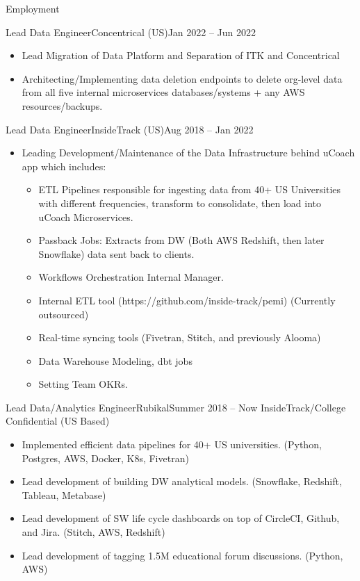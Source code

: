 \documentclass[]{ahmedamrcv_saudi}
\begin{document}
\begin{cvsection}{Employment}
		\begin{cvsubsection}{Lead Data Engineer}{Concentrical (US)}{Jan 2022 -- Jun 2022}
			\begin{itemize}
				\item Lead Migration of Data Platform and Separation of ITK and Concentrical
				\item Architecting/Implementing data deletion endpoints to delete org-level data from all five internal microservices databases/systems + any AWS resources/backups.
			\end{itemize}
		\end{cvsubsection}

		\begin{cvsubsection}{Lead Data Engineer}{InsideTrack (US)}{Aug 2018 -- Jan 2022}
			\begin{itemize}
				\item Leading Development/Maintenance of the Data Infrastructure behind uCoach app which includes:
				\begin{itemize}
					\item ETL Pipelines responsible for ingesting data from 40+ US Universities with different frequencies, transform to consolidate, then load into uCoach Microservices.
					\item Passback Jobs: Extracts from DW (Both AWS Redshift, then later Snowflake) data sent back to clients.
					\item Workflows Orchestration Internal Manager.
					\item Internal ETL tool (https://github.com/inside-track/pemi) (Currently outsourced)
					\item Real-time syncing tools (Fivetran, Stitch, and previously Alooma)
					\item Data Warehouse Modeling, dbt jobs
					\item Setting Team OKRs.
				\end{itemize}
			\end{itemize}
		\end{cvsubsection}

		\begin{cvsubsection}{Lead Data/Analytics Engineer}{Rubikal}{Summer 2018 -- Now}
			{InsideTrack/College Confidential} (US Based)			
			\begin{itemize}
				\item Implemented efficient data pipelines for 40+ US universities. (Python, Postgres, AWS, Docker, K8s, Fivetran)
				\item Lead development of building DW analytical models. (Snowflake, Redshift, Tableau, Metabase)
				\item Lead development of SW life cycle dashboards on top of CircleCI, Github, and Jira. (Stitch, AWS, Redshift)
				\item Lead development of tagging 1.5M educational forum discussions. (Python, AWS)
			\end{itemize}
		\end{cvsubsection}
		

\end{cvsection}
\end{document}

